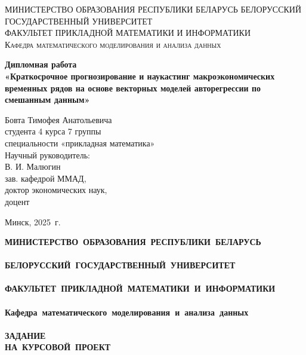 \documentclass[a4paper, 14pt]{extreport}
\numberwithin{equation}{section}
\renewcommand{\contentsname}%
	{\centering \large ОГЛАВЛЕНИЕ}%
\numberwithin{equation}{section}
\begin{document}
	\def\contentsname{ОГЛАВЛЕНИЕ}
	
	\begin{titlepage}
		\begin{center}
			\textsc{МИНИСТЕРСТВО ОБРАЗОВАНИЯ РЕСПУБЛИКИ БЕЛАРУСЬ БЕЛОРУССКИЙ ГОСУДАРСТВЕННЫЙ УНИВЕРСИТЕТ
				\\[5mm]
				ФАКУЛЬТЕТ ПРИКЛАДНОЙ МАТЕМАТИКИ И ИНФОРМАТИКИ\\[2mm]
				Кафедра математического моделирования и анализа данных
			}
			
			\vfill
			
			\textbf{Дипломная работа
				\\[3mm]
				«Краткосрочное прогнозирование и наукастинг макроэкономических временных рядов на основе векторных моделей авторегрессии по смешанным данным»
				\\[26mm]
			}
		\end{center}
		
		\hfill
		\begin{minipage}{.5\textwidth}
			\begin{flushright}
				Бовта Тимофея Анатольевича\\
				студента 4 курса 7 группы\\
				специальности «прикладная математика»\\[5mm]
				
				Научный руководитель:\\[2mm] 
				В. И. Малюгин\\
				зав. кафедрой ММАД,\\
				доктор экономических наук,\\
				доцент
			\end{flushright}
		\end{minipage}%
		\vfill
		\begin{center}
			Минск, 2025\ г.
		\end{center}
	\end{titlepage}
	\newpage
	\setcounter{page}{2}
	\begin{center}
		\bf
		{
			\small\mbox{МИНИСТЕРСТВО~ОБРАЗОВАНИЯ~РЕСПУБЛИКИ~БЕЛАРУСЬ} \\~\\
			\mbox{БЕЛОРУССКИЙ~ГОСУДАРСТВЕННЫЙ~УНИВЕРСИТЕТ} \\~\\
			\mbox{ФАКУЛЬТЕТ~ПРИКЛАДНОЙ МАТЕМАТИКИ~И~ИНФОРМАТИКИ} \\~\\
			\mbox{Кафедра~математического~моделирования~и~анализа~данных} \\~\\[2mm]
		}
		\bf
		{
			\mbox{\small ЗАДАНИЕ}\\
			\mbox{\small НА КУРСОВОЙ ПРОЕКТ} \\[6mm]
		}
	\end{center}
\end{document}
